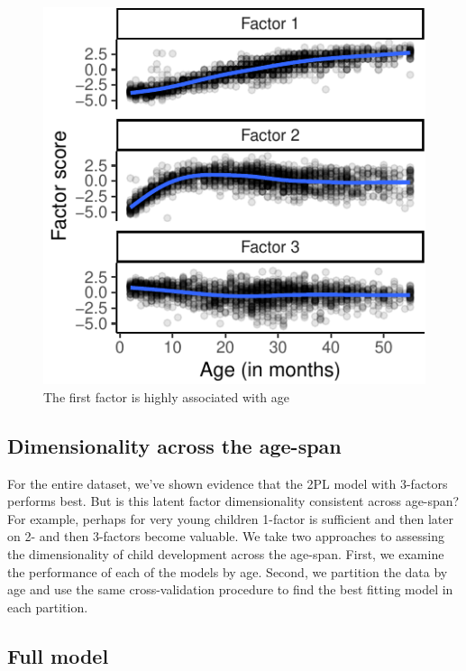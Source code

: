 \documentclass[10pt, letterpaper]{article}
\newenvironment{CodeChunk}{}{}
\begin{document}
\begin{CodeChunk}
\begin{figure}[tb]
\includegraphics{figs/factorscores-1} \caption[The first factor is highly associated with age]{The first factor is highly associated with age}\label{fig:factorscores}
\end{figure}
\end{CodeChunk}

\hypertarget{dimensionality-across-the-age-span}{%
\subsection{Dimensionality across the
age-span}\label{dimensionality-across-the-age-span}}

For the entire dataset, we've shown evidence that the 2PL model with
3-factors performs best. But is this latent factor dimensionality
consistent across age-span? For example, perhaps for very young children
1-factor is sufficient and then later on 2- and then 3-factors become
valuable. We take two approaches to assessing the dimensionality of
child development across the age-span. First, we examine the performance
of each of the models by age. Second, we partition the data by age and
use the same cross-validation procedure to find the best fitting model
in each partition.

\hypertarget{full}{%
\subsection{Full model}\label{full}}
\end{document}
